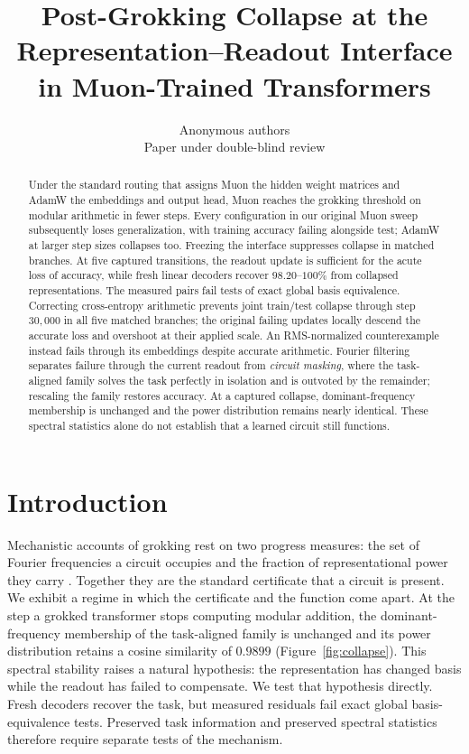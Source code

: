 \documentclass{article}
\title{Post-Grokking Collapse at the Representation--Readout Interface\\ in Muon-Trained Transformers}
\author{Anonymous authors\\
Paper under double-blind review}
\begin{document}
\maketitle

\begin{abstract}
Under the standard routing that assigns Muon the hidden weight matrices and AdamW the embeddings and output head, Muon reaches the grokking threshold on modular arithmetic in fewer steps. Every configuration in our original Muon sweep subsequently loses generalization, with training accuracy failing alongside test; AdamW at larger step sizes collapses too. Freezing the interface suppresses collapse in matched branches. At five captured transitions, the readout update is sufficient for the acute loss of accuracy, while fresh linear decoders recover $98.20$--$100\%$ from collapsed representations. The measured pairs fail tests of exact global basis equivalence. Correcting cross-entropy arithmetic prevents joint train/test collapse through step $30{,}000$ in all five matched branches; the original failing updates locally descend the accurate loss and overshoot at their applied scale. An RMS-normalized counterexample instead fails through its embeddings despite accurate arithmetic. Fourier filtering separates failure through the current readout from \emph{circuit masking}, where the task-aligned family solves the task perfectly in isolation and is outvoted by the remainder; rescaling the family restores accuracy. At a captured collapse, dominant-frequency membership is unchanged and the power distribution remains nearly identical. These spectral statistics alone do not establish that a learned circuit still functions.
\end{abstract}

\section{Introduction}
\label{sec:intro}

Mechanistic accounts of grokking rest on two progress measures: the set of Fourier frequencies a circuit occupies and the fraction of representational power they carry \citep{nanda2023progress}. Together they are the standard certificate that a circuit is present. We exhibit a regime in which the certificate and the function come apart. At the step a grokked transformer stops computing modular addition, the dominant-frequency membership of the task-aligned family is unchanged and its power distribution retains a cosine similarity of $0.9899$ (Figure~\ref{fig:collapse}). This spectral stability raises a natural hypothesis: the representation has changed basis while the readout has failed to compensate. We test that hypothesis directly. Fresh decoders recover the task, but measured residuals fail exact global basis-equivalence tests. Preserved task information and preserved spectral statistics therefore require separate tests of the mechanism.
\end{document}
